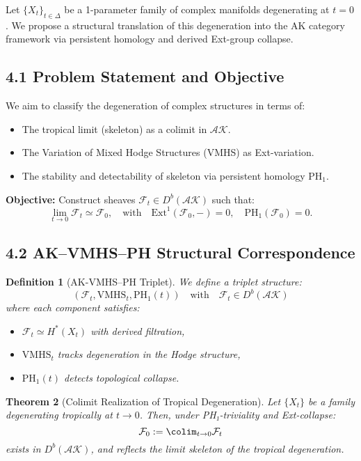 \documentclass[11pt]{article}
\newtheorem{theorem}{Theorem}[section]
\newtheorem{definition}[theorem]{Definition}
\begin{document}
Let \( \{X_t\}_{t \in \Delta} \) be a 1-parameter family of complex manifolds degenerating at \( t=0 \).  
We propose a structural translation of this degeneration into the AK category framework via persistent homology and derived Ext-group collapse.

\subsection{4.1 Problem Statement and Objective}

We aim to classify the degeneration of complex structures in terms of:

\begin{itemize}
    \item The tropical limit (skeleton) as a colimit in \( \mathcal{AK} \).
    \item The Variation of Mixed Hodge Structures (VMHS) as Ext-variation.
    \item The stability and detectability of skeleton via persistent homology \( \mathrm{PH}_1 \).
\end{itemize}

\textbf{Objective:} Construct sheaves \( \mathcal{F}_t \in D^b(\mathcal{AK}) \) such that:
\[
\lim_{t \to 0} \mathcal{F}_t \simeq \mathcal{F}_0, \quad \text{with} \quad \mathrm{Ext}^1(\mathcal{F}_0, -) = 0, \quad \mathrm{PH}_1(\mathcal{F}_0) = 0.
\]

\subsection{4.2 AK–VMHS–PH Structural Correspondence}

\begin{definition}[AK-VMHS–PH Triplet]
We define a triplet structure:
\[
(\mathcal{F}_t, \mathrm{VMHS}_t, \mathrm{PH}_1(t)) \quad \text{with} \quad \mathcal{F}_t \in D^b(\mathcal{AK})
\]
where each component satisfies:
\begin{itemize}
    \item \( \mathcal{F}_t \simeq H^*(X_t) \) with derived filtration,
    \item \( \mathrm{VMHS}_t \) tracks degeneration in the Hodge structure,
    \item \( \mathrm{PH}_1(t) \) detects topological collapse.
\end{itemize}
\end{definition}

\begin{theorem}[Colimit Realization of Tropical Degeneration]
Let \( \{X_t\} \) be a family degenerating tropically at \( t \to 0 \). Then, under PH₁-triviality and Ext-collapse:
\[
\mathcal{F}_0 := \colim_{t \to 0} \mathcal{F}_t
\]
exists in \( D^b(\mathcal{AK}) \), and reflects the limit skeleton of the tropical degeneration.
\end{theorem}
\end{document}
